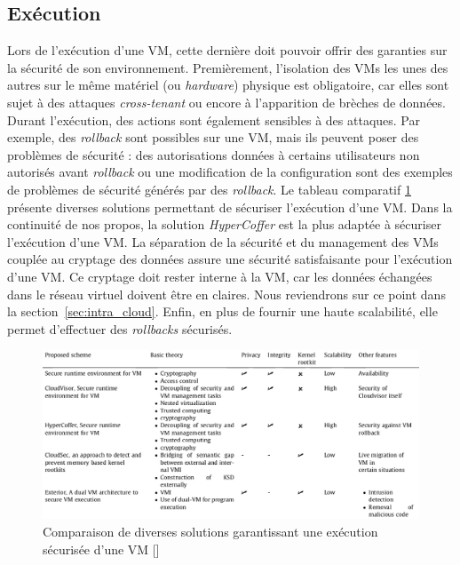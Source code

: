 \subsection{Exécution}
Lors de l'exécution d'une VM, cette dernière doit pouvoir offrir des garanties sur la sécurité de son environnement. Premièrement, l'isolation des VMs les unes des autres sur le même matériel (ou \textit{hardware}) physique est obligatoire, car elles sont sujet à des attaques \textit{cross-tenant} ou encore à l'apparition de brèches de données.
Durant l'exécution, des actions sont également sensibles à des attaques. Par exemple, des \textit{rollback} sont possibles sur une VM, mais ils peuvent poser des problèmes de sécurité : des autorisations données à certains utilisateurs non autorisés avant \textit{rollback} ou une modification de la configuration sont des exemples de problèmes de sécurité générés par des \textit{rollback}.
Le tableau comparatif \ref{label-image14} présente diverses solutions permettant de sécuriser l'exécution d'une VM.
Dans la continuité de nos propos, la solution \textit{HyperCoffer} est la plus adaptée à sécuriser l'exécution d'une VM. La séparation de la sécurité et du management des VMs couplée au cryptage des données assure une sécurité satisfaisante pour l'exécution d'une VM. Ce cryptage doit rester interne à la VM, car les données échangées dans le réseau virtuel doivent être en claires. Nous reviendrons sur ce point dans la section~\ref{sec:intra_cloud}. Enfin, en plus de fournir une haute scalabilité, elle permet d'effectuer des \textit{rollbacks} sécurisés.

\begin{figure}[h]
	\center
	\includegraphics[width=15.5cm]{./pics/security_execution_VM_tableau.png}
	\caption{Comparaison de diverses solutions garantissant une exécution sécurisée d'une VM [\cite{security_cloud_survey}]}
	\label{label-image14}
\end{figure}

